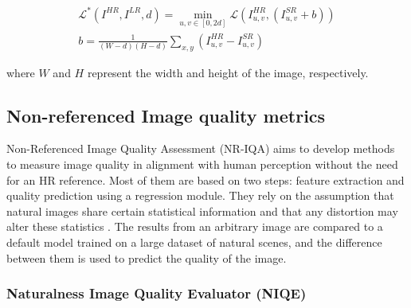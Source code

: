             \begin{equation}
                \begin{aligned}
                    \mathcal{L}^* ( I^{HR}, I^{LR}, d) = \min_{u,v \in [0,2d]} \mathcal{L} ( I^{HR}_{u,v}, (I^{SR}_{u,v}+b)) \\
                    b = \frac{1}{(W - d)(H - d)} \sum_{x,y} \left( I^{HR}_{u,v} - I^{SR}_{u,v} \right)
               \end{aligned}
            \end{equation}
    
            \noindent where $W$ and $H$ represent the width and height of the image, respectively.
    

    \subsection{Non-referenced Image quality metrics}

    Non-Referenced Image Quality Assessment (NR-IQA) aims to develop methods to measure image quality in alignment with human perception without the need for an HR reference. 
    Most of them are based on two steps: feature extraction and quality prediction using a regression module. 
    They rely on the assumption that natural images share certain statistical information and that any distortion may alter these statistics \cite{niqe}.
    The results from an arbitrary image are compared to a default model trained on a large dataset of natural scenes, and the difference between them is used to predict the quality of the image.



        

        \subsubsection{Naturalness Image Quality Evaluator (NIQE)}


